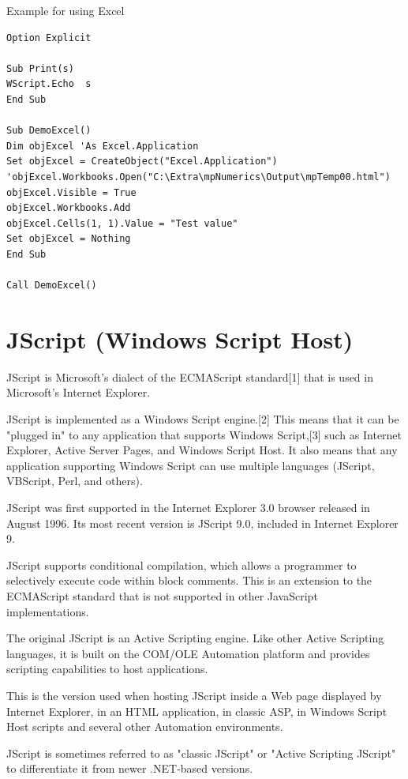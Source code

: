 \vpara
Example for using Excel

\begin{lstlisting}
Option Explicit

Sub Print(s)
WScript.Echo  s
End Sub

Sub DemoExcel()
Dim objExcel 'As Excel.Application
Set objExcel = CreateObject("Excel.Application")
'objExcel.Workbooks.Open("C:\Extra\mpNumerics\Output\mpTemp00.html")
objExcel.Visible = True
objExcel.Workbooks.Add
objExcel.Cells(1, 1).Value = "Test value"
Set objExcel = Nothing
End Sub

Call DemoExcel()
\end{lstlisting}




\newpage
\section{JScript (Windows Script Host)}
JScript is Microsoft's dialect of the ECMAScript standard[1] that is used in Microsoft's Internet Explorer.

\vpara
JScript is implemented as a Windows Script engine.[2] This means that it can be "plugged in" to any application that supports Windows Script,[3] such as Internet Explorer, Active Server Pages, and Windows Script Host. It also means that any application supporting Windows Script can use multiple languages (JScript, VBScript, Perl, and others).

\vpara
JScript was first supported in the Internet Explorer 3.0 browser released in August 1996. Its most recent version is JScript 9.0, included in Internet Explorer 9.

\vpara
JScript supports conditional compilation, which allows a programmer to selectively execute code within block comments. This is an extension to the ECMAScript standard that is not supported in other JavaScript implementations.

\vpara
The original JScript is an Active Scripting engine. Like other Active Scripting languages, it is built on the COM/OLE Automation platform and provides scripting capabilities to host applications.

\vpara
This is the version used when hosting JScript inside a Web page displayed by Internet Explorer, in an HTML application, in classic ASP, in Windows Script Host scripts and several other Automation environments.

\vpara
JScript is sometimes referred to as "classic JScript" or "Active Scripting JScript" to differentiate it from newer .NET-based versions.

